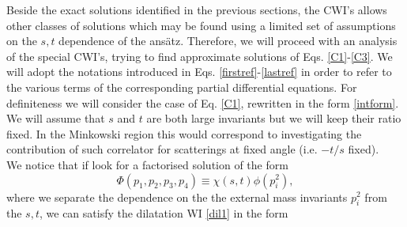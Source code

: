 \documentclass[a4paper,11pt,openright,twoside]{book}
\numberwithin{equation}{section}
\begin{document}
{{	
	
	Beside the exact solutions identified in the previous sections, the CWI's allows other classes of solutions which may be found using a limited set of assumptions on the $s,t$ dependence of the ans\"atz. Therefore, we will proceed with an analysis of the special CWI's, trying to find approximate solutions of Eqs. \eqref{C1}-\eqref{C3}. We will adopt the notations introduced in Eqs. \eqref{firstref}-\eqref{lastref} in order to refer to the various terms of the corresponding partial differential equations. For definiteness we will consider the case of Eq. \eqref{C1}, rewritten in the form \eqref{intform}. We will assume that $s$  and $t$ are both large invariants but we will keep their ratio fixed. In the Minkowski region this would correspond to investigating the contribution of such correlator for scatterings at fixed angle (i.e. $-t/s$ fixed).\\
	We notice that if look for a factorised solution of the form 
	\begin{equation}
		\Phi(p_1,p_2,p_3,p_4)\equiv\chi(s,t) \phi(p_i^2),
		\label{phi}
	\end{equation}
	where we separate the dependence on the the external mass invariants $p_i^2$ from the $s,t$, we can satisfy the dilatation WI \eqref{dil1}  in the form 
	
}}
\end{document}
